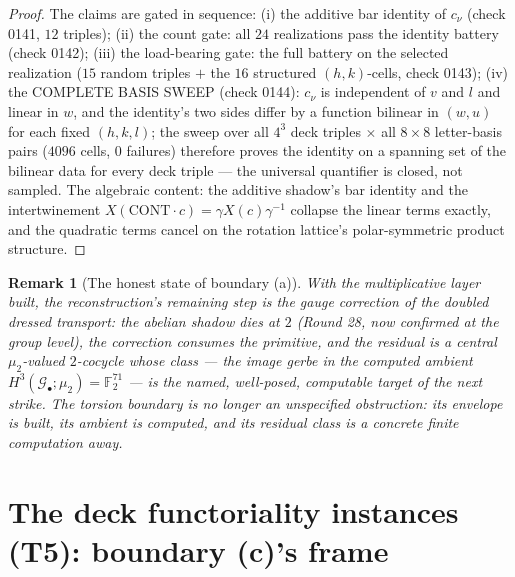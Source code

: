 \documentclass[11pt]{article}
\newtheorem{remark}[theorem]{Remark}
\newcommand{\Gbul}{\mathcal{G}_\bullet}
\newcommand{\F}{\mathbb{F}}
\newcommand{\mud}{\mu_2}
\begin{document}
\begin{proof}
The claims are gated in sequence: (i) the additive bar identity of
$c_\nu$ (check 0141, $12$ triples); (ii) the count gate: all $24$
realizations pass the identity battery (check 0142); (iii) the
load-bearing gate: the full battery on the selected realization ($15$
random triples $+$ the $16$ structured $(h,k)$-cells, check 0143);
(iv) the COMPLETE
BASIS SWEEP (check 0144): $c_\nu$ is independent of $v$ and $l$ and
linear in $w$, and the identity's two sides differ by a function
bilinear in $(w,u)$ for each fixed $(h,k,l)$; the sweep over all
$4^3$ deck triples $\times$ all $8\times8$ letter-basis pairs
($4096$ cells, $0$ failures) therefore proves the identity on a
spanning set of the bilinear data for every deck triple --- the
universal quantifier is closed, not sampled. The algebraic content:
the additive shadow's bar identity and the intertwinement
$X(\mathrm{CONT}\cdot c)=\gamma X(c)\gamma^{-1}$ collapse the linear
terms exactly, and the quadratic terms cancel on the rotation
lattice's polar-symmetric product structure.
\end{proof}

\begin{remark}[The honest state of boundary (a)]
With the multiplicative layer built, the reconstruction's remaining
step is the gauge correction of the \emph{doubled} dressed transport:
the abelian shadow dies at $2$ (Round 28, now confirmed at the group
level), the correction consumes the primitive, and the residual is a
central $\mud$-valued $2$-cocycle whose class --- the image gerbe in
the computed ambient $H^3(\Gbul;\mud)=\F_2^{71}$ --- is the named,
well-posed, computable target of the next strike. The torsion
boundary is no longer an unspecified obstruction: its envelope is
built, its ambient is computed, and its residual class is a concrete
finite computation away.
\end{remark}

\section{The deck functoriality instances (T5): boundary (c)'s frame}
\end{document}
